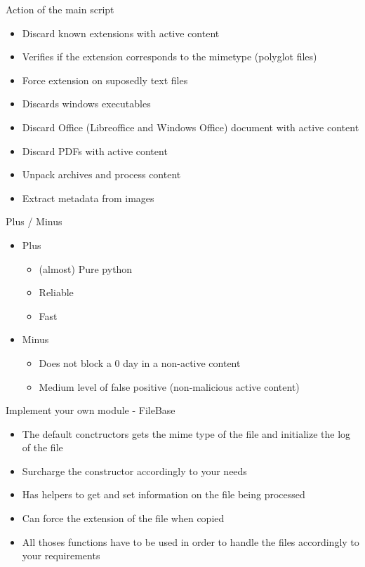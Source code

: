 \begin{frame}[fragile]{Action of the main script}
    \begin{itemize}
        \item Discard known extensions with active content
        \item Verifies if the extension corresponds to the mimetype (polyglot files)
        \item Force extension on suposedly text files
        \item Discards windows executables
        \item Discard Office (Libreoffice and Windows Office) document with active content
        \item Discard PDFs with active content
        \item Unpack archives and process content
        \item Extract metadata from images
   \end{itemize}
\end{frame}

\begin{frame}[fragile]{Plus / Minus}
    \begin{itemize}
        \item Plus
        \begin{itemize}
            \item (almost) Pure python
            \item Reliable
            \item Fast
        \end{itemize}
        \item Minus
        \begin{itemize}
            \item Does not block a 0 day in a non-active content
            \item Medium level of false positive (non-malicious active content)
        \end{itemize}
   \end{itemize}
\end{frame}

\begin{frame}[fragile]{Implement your own module - FileBase}
    \begin{itemize}
        \item The default conctructors gets the mime type of the file and initialize the log of the file
        \item Surcharge the constructor accordingly to your needs
        \item Has helpers to get and set information on the file being processed
        \item Can force the extension of the file when copied
        \item All thoses functions have to be used in order to handle the files accordingly to your requirements
   \end{itemize}
\end{frame}

